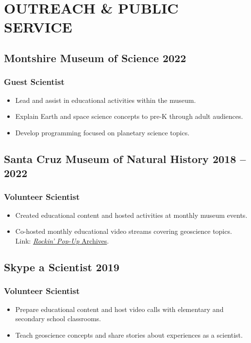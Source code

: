 \section*{OUTREACH \& PUBLIC SERVICE}

\subsection*{\textbf{Montshire Museum of Science} \hfill 2022}
\subsubsection*{Guest Scientist}
\begin{itemize}
\item Lead and assist in educational activities within the museum.
\item Explain Earth and space science concepts to pre-K through adult audiences.
\item Develop programming focused on planetary science topics.
\end{itemize}

\subsection*{\textbf{Santa Cruz Museum of Natural History} \hfill 2018 – 2022}
\subsubsection*{Volunteer Scientist}
\begin{itemize}
	\item Created educational content and hosted activities at monthly museum events.
	\item Co-hosted monthly educational video streams covering geoscience topics. \\
	Link: \href{https://www.santacruzmuseum.org/category/rockin-pop-up/}{\emph{Rockin' Pop-Up} Archives}.
\end{itemize}

\subsection*{\textbf{Skype a Scientist} \hfill 2019~\textrightarrow~}
\subsubsection*{Volunteer Scientist}
\begin{itemize}
	\item Prepare educational content and host video calls with elementary and secondary school classrooms.
	\item Teach geoscience concepts and share stories about experiences as a scientist.
\end{itemize}


